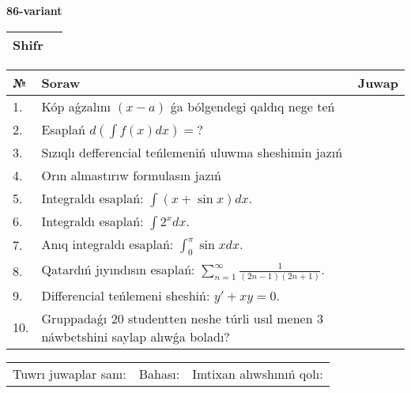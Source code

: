 \documentclass{article}
\begin{document}
  \egroup
  
  \newpage
  
  
  \textbf{86-variant}\\
  
  \bgroup
  \def\arraystretch{1.6} %
  
  \begin{tabular}{|m{5.7cm}|m{9.5cm}|}
  \hline
  Shifr & \\
  \hline
  \end{tabular}
  
  \vspace{1cm}
  
  \begin{tabular}{|m{0.7cm}|m{10cm}|m{4cm}|}
  \hline
  № & Soraw & Juwap \\
  \hline
  1. & Kóp aǵzalını \((x - a)\) ǵa bólgendegi qaldıq nege teń &  \\
  \hline
  2. & Esaplań \(d\left( \int{f(x)dx} \right) = ?\) &  \\
  \hline
  3. & Sızıqlı defferencial teńlemeniń uluwma sheshimin jazıń &  \\
  \hline
  4. & Orın almastırıw formulasın jazıń &  \\
  \hline
  5. & Integraldı esaplań: \(\int{(x + \sin x)dx}\). &  \\
  \hline
  6. & Integraldı esaplań: \(\int{2^{x}dx}\). &  \\
  \hline
  7. & Anıq integraldı esaplań: \(\int_{0}^{\pi}{\sin xdx}\). &  \\
  \hline
  8. & Qatardıń jıyındısın esaplań: \(\sum_{n = 1}^{\infty}\frac{1}{(2n - 1)(2n + 1)}\). &  \\
  \hline
  9. & Differencial teńlemeni sheshiń: \(y' + xy = 0\). &  \\
  \hline
  10. & Gruppadaǵı 20 studentten neshe túrli usıl menen 3 náwbetshini saylap alıwǵa boladı? &  \\
  \hline
  \end{tabular}
  
  \vspace{1cm}
  
  \begin{tabular}{lll}
  Tuwrı juwaplar sanı: \underline{\hspace{1.5cm}} & 
  Bahası: \underline{\hspace{1.5cm}} & 
  Imtixan alıwshınıń qolı: \underline{\hspace{2cm}} \\
  \end{tabular}
  
\end{document}
